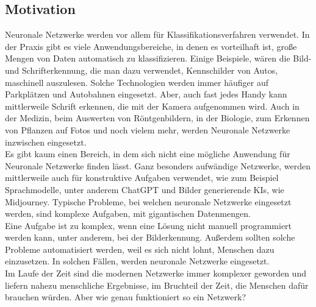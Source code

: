 \documentclass[12pt]{article}
\begin{document}
\subsection{Motivation}
Neuronale Netzwerke werden vor allem für Klassifikationsverfahren verwendet. In der Praxis gibt es viele Anwendungsbereiche, in denen es vorteilhaft ist, große Mengen von Daten automatisch zu klassifizieren. Einige Beispiele, wären die Bild- und Schrifterkennung, die man dazu verwendet, Kennschilder von Autos, maschinell auszulesen. Solche Technologien werden immer häufiger auf Parkplätzen und Autobahnen eingesetzt. Aber, auch fast jedes Handy kann mittlerweile Schrift erkennen, die mit der Kamera aufgenommen wird. Auch in der Medizin, beim Auswerten von Röntgenbildern, in der Biologie, zum Erkennen von Pflanzen auf Fotos und noch vielem mehr, werden Neuronale Netzwerke inzwischen eingesetzt.\\
Es gibt kaum einen Bereich, in dem sich nicht eine mögliche Anwendung für Neuronale Netzwerke finden lässt. Ganz besonders aufwändige Netzwerke, werden mittlerweile auch für konstruktive Aufgaben verwendet, wie zum Beispiel Sprachmodelle, unter anderem ChatGPT und Bilder generierende KIs, wie Midjourney.
Typische Probleme, bei welchen neuronale Netzwerke eingesetzt werden, sind komplexe Aufgaben, mit gigantischen Datenmengen.\\
Eine Aufgabe ist zu komplex, wenn eine Lösung nicht manuell programmiert werden kann, unter anderem, bei der Bilderkennung. Außerdem sollten solche Probleme automatisiert werden, weil es sich nicht lohnt, Menschen dazu einzusetzen. 
In solchen Fällen, werden neuronale Netzwerke eingesetzt.\\
Im Laufe der Zeit sind die modernen Netzwerke immer komplexer geworden und liefern nahezu menschliche Ergebnisse, im Bruchteil der Zeit, die Menschen dafür brauchen würden. Aber wie genau funktioniert so ein Netzwerk?



\cleardoublepage
\sloppy
\end{document}
